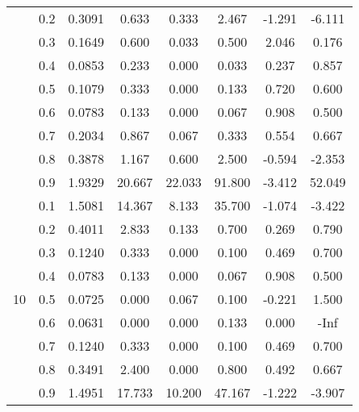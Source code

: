 \documentclass[11pt,a4paper]{report}
\begin{document}
\begin{longtable}{ | c | c || c | c | c | c | c | c | }
 & 0.2 & 0.3091 & 0.633 & 0.333 & 2.467 & -1.291 & -6.111 \\
 & 0.3 & 0.1649 & 0.600 & 0.033 & 0.500 & 2.046 & 0.176 \\
 & 0.4 & 0.0853 & 0.233 & 0.000 & 0.033 & 0.237 & 0.857 \\
 & 0.5 & 0.1079 & 0.333 & 0.000 & 0.133 & 0.720 & 0.600 \\
 & 0.6 & 0.0783 & 0.133 & 0.000 & 0.067 & 0.908 & 0.500 \\
 & 0.7 & 0.2034 & 0.867 & 0.067 & 0.333 & 0.554 & 0.667 \\
 & 0.8 & 0.3878 & 1.167 & 0.600 & 2.500 & -0.594 & -2.353 \\
 & 0.9 & 1.9329 & 20.667 & 22.033 & 91.800 & -3.412 & 52.049 \\
 \hline
\multirow{9}{*}{10} & 0.1 & 1.5081 & 14.367 & 8.133 & 35.700 & -1.074 & -3.422 \\
 & 0.2 & 0.4011 & 2.833 & 0.133 & 0.700 & 0.269 & 0.790 \\
 & 0.3 & 0.1240 & 0.333 & 0.000 & 0.100 & 0.469 & 0.700 \\
 & 0.4 & 0.0783 & 0.133 & 0.000 & 0.067 & 0.908 & 0.500 \\
 & 0.5 & 0.0725 & 0.000 & 0.067 & 0.100 & -0.221 & 1.500 \\
 & 0.6 & 0.0631 & 0.000 & 0.000 & 0.133 & 0.000 & -Inf \\
 & 0.7 & 0.1240 & 0.333 & 0.000 & 0.100 & 0.469 & 0.700 \\
 & 0.8 & 0.3491 & 2.400 & 0.000 & 0.800 & 0.492 & 0.667 \\
 & 0.9 & 1.4951 & 17.733 & 10.200 & 47.167 & -1.222 & -3.907 \\
 \hline
\hline
\end{longtable}
\end{document}
